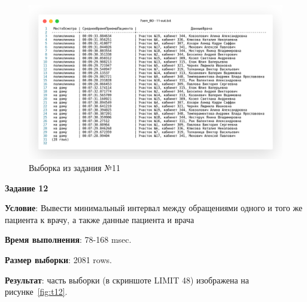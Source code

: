\begin{figure}[!h]
  \centering

  \includegraphics[width=18cm]
  {../sql/task11/11-out.png}

  \caption{Выборка из задания №11}

  \label{fig:t11}
\end{figure}


\newpage

\begin{center}
  \textbf{Задание 12}
\end{center}
  
\textbf{Условие}:
Вывести минимальный интервал между обращениями одного и того же пациента к врачу,
а также данные пациента и врача



\textbf{Время выполнения}: 78-168 msec.

\textbf{Размер выборки}: 2081 rows.

\textbf{Результат}: часть выборки (в скриншоте LIMIT 48) изображена на рисунке~\ref{fig:t12}.

